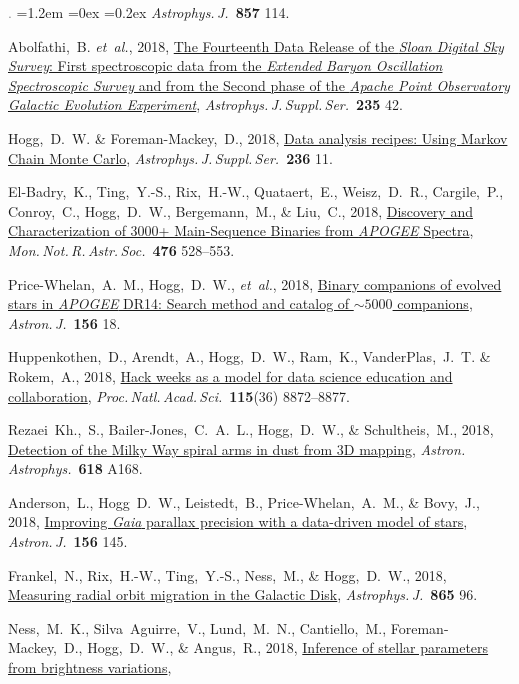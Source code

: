 \documentclass[10pt,letterpaper]{article}
\newcommand{\foreign}[1]{\textsl{#1}}
\newcommand{\etal}{\foreign{et~al.}}
\newcommand{\project}[1]{\textsl{#1}}
\newcommand{\doi}[2]{\href{http://dx.doi.org/#1}{{#2}}}
\newcommand{\deemph}[1]{\textcolor{grey}{\footnotesize{#1}}}
\newcommand{\pubnumber}[1]{\deemph{{#1}.}}
\newcounter{refpubnum}
\newcommand{\hogglist}{%
    \rightmargin=0in
    \leftmargin=1.2em
    \topsep=0ex
    \partopsep=0pt
    \itemsep=0.2ex
    \parsep=0pt
    \itemindent=-1.0\leftmargin
    \listparindent=0.0\leftmargin
    \settowidth{\labelsep}{~}
    \usecounter{refpubnum}
  }
\begin{document}
\begin{list}{\pubnumber{\therefpubnum}}{\hogglist}
\textit{Astrophys.\,J.}\ \textbf{857} 114.
\item
Abolfathi,~B. \etal, 2018,
\doi{10.3847/1538-4365/aa9e8a}{The Fourteenth Data Release of the \project{Sloan Digital Sky Survey}: First spectroscopic data from the \project{Extended Baryon Oscillation Spectroscopic Survey} and from the Second phase of the \project{Apache Point Observatory Galactic Evolution Experiment}},
\textit{Astrophys.\,J.\,Suppl.\,Ser.}\ \textbf{235} 42.
\item
Hogg,~D.~W. \& Foreman-Mackey,~D., 2018,
\doi{10.3847/1538-4365/aab76e}{Data analysis recipes: Using Markov Chain Monte Carlo},
\textit{Astrophys.\,J.\,Suppl.\,Ser.}\ \textbf{236} 11.
\item
El-Badry,~K., Ting,~Y.-S., Rix,~H.-W., Quataert,~E., Weisz,~D.~R., Cargile,~P., Conroy,~C., Hogg,~D.~W., Bergemann,~M., \& Liu,~C., 2018,
\doi{10.1093/mnras/sty240}{Discovery and Characterization of 3000+ Main-Sequence Binaries from \project{APOGEE} Spectra},
\textit{Mon.\,Not.\,R.\,Astr.\,Soc.}\ \textbf{476} 528--553.
\item
Price-Whelan,~A.~M., Hogg,~D.~W., \etal, 2018,
\doi{10.3847/1538-3881/aac387}{Binary companions of evolved stars in \project{APOGEE} DR14: Search method and catalog of $\sim5000$ companions},
\textit{Astron.\,J.}\ \textbf{156} 18.
\item
Huppenkothen,~D., Arendt,~A., Hogg,~D.~W., Ram,~K., VanderPlas,~J.~T. \& Rokem,~A., 2018,
\doi{10.1073/pnas.1717196115}{Hack weeks as a model for data science education and collaboration},
\textit{Proc.\,Natl.\,Acad.\,Sci.}\ \textbf{115}(36) 8872--8877.
\item
Rezaei~Kh.,~S., Bailer-Jones,~C.~A.~L., Hogg,~D.~W., \& Schultheis,~M., 2018,
\doi{10.1051/0004-6361/201833284}{Detection of the Milky Way spiral arms in dust from 3D mapping},
\textit{Astron.\,Astrophys.}\ \textbf{618} A168.
\item
Anderson,~L., Hogg~D.~W., Leistedt,~B., Price-Whelan,~A.~M., \& Bovy,~J., 2018,
\doi{10.3847/1538-3881/aad7bf}{Improving \project{Gaia} parallax precision with a data-driven model of stars},
\textit{Astron.\,J.}\ \textbf{156} 145.
\item
Frankel,~N., Rix,~H.-W., Ting,~Y.-S., Ness,~M., \& Hogg,~D.~W., 2018,
\doi{10.3847/1538-4357/aadba5}{Measuring radial orbit migration in the Galactic Disk},
\textit{Astrophys.\,J.}\ \textbf{865} 96.
\item
Ness,~M.~K., Silva~Aguirre,~V., Lund,~M.~N., Cantiello,~M., Foreman-Mackey,~D.,
Hogg,~D.~W., \& Angus,~R., 2018,
\doi{10.3847/1538-4357/aadb40}{Inference of stellar parameters from brightness variations},

\end{list}
\end{document}
